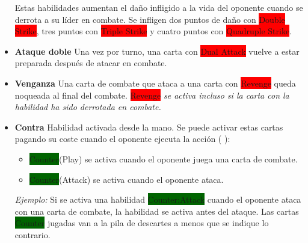 \documentclass[10pt,a4paper]{article}
\begin{document}
\begin{shaded}
\begin{itemize}
    Estas habilidades aumentan el daño infligido a la vida del oponente cuando se derrota a su líder en combate. Se infligen dos puntos de daño con \colorbox{red}{\color{white}Double Strike}, tres puntos con \colorbox{red}{\color{white}Triple Strike} y cuatro puntos con \colorbox{red}{\color{white}Quadruple Strike}.
    \item \textbf{Ataque doble} \newline
    Una vez por turno, una carta con \colorbox{red}{\color{white}Dual Attack} vuelve a estar preparada después de atacar en combate.
    \item \textbf{Venganza} \newline
    Una carta de combate que ataca a una carta con \colorbox{red}{\color{white}Revenge} queda noqueada al final del combate.
    \colorbox{red}{\color{white}Revenge} \emph{se activa incluso si la carta con la habilidad ha sido derrotada en combate.}
    \item \textbf{Contra} \newline
    Habilidad activada desde la mano.
    Se puede activar estas cartas pagando su coste cuando el oponente ejecuta la acción ( ):
    \begin{itemize}
      \item \colorbox{darkgreen}{\color{white}Counter}(Play) se activa cuando el oponente juega una carta de combate.
      \item \colorbox{darkgreen}{\color{white}Counter}(Attack) se activa cuando el oponente ataca.
    \end{itemize}
    \emph{Ejemplo:} Si se activa una habilidad \colorbox{darkgreen}{\color{white}Counter:Attack} cuando el oponente ataca con una carta de combate, la habilidad se activa antes del ataque. Las cartas \colorbox{darkgreen}{\color{white}Counter} jugadas van a la pila de descartes a menos que se indique lo contrario.
  \end{itemize}
\end{shaded}


\end{document}

